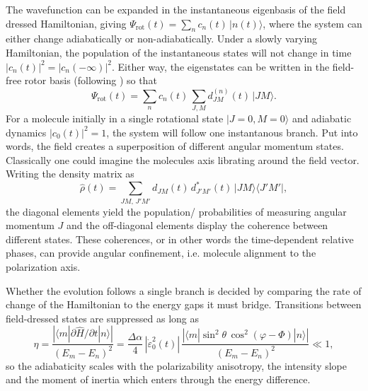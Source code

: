 The wavefunction can be expanded in the instantaneous eigenbasis of the field dressed Hamiltonian, giving $\Psi_{\mathrm{rot}}(t) = \sum_n c_n(t)\,|n(t)\rangle$, where the system can either change adiabatically or non-adiabatically. Under a slowly varying Hamiltonian, the population of the instantaneous states will not change in time $|c_n(t)|^2 = |c_n(-\infty)|^2$. Either way, the eigenstates can be written in the field-free rotor basis (following \cite{nielsenLaserInducedAlignmentMolecules2022}) so that 
\begin{equation}
    \Psi_{\mathrm{rot}}(t) = \sum_n c_n(t)\,\sum_{J,M} d^{(n)}_{JM}(t)\,\lvert J M\rangle .
    \label{eq:eigenstate_expansion}
\end{equation}
For a molecule initially in a single rotational state $\lvert J=0, M=0\rangle$ and adiabatic dynamics $|c_0(t)|^2 = 1$, the system will follow one instantanous branch.
Put into words, the field creates a superposition of different angular momentum states. Classically one could imagine the molecules axis librating around the field vector.
Writing the density matrix as
\begin{equation}
    \hat{\rho}(t) = \sum_{JM,\,J'M'} d_{JM}(t)\, d^{*}_{J'M'}(t)\, \lvert J M\rangle \langle J' M'\rvert ,
    \label{eq:density_matrix}
\end{equation}
the diagonal elements yield the population/ probabilities of measuring angular momentum $J$ and the off-diagonal elements display the coherence between different states. These coherences, or in other words the time-dependent relative phases, can provide angular confinement, i.e. molecule alignment to the polarization axis.

Whether the evolution follows a single branch is decided by comparing the rate of change of the Hamiltonian to the energy gaps it must bridge. Transitions between field-dressed states are suppressed as long as \cite{omisteTheoreticalDescriptionAdiabatic2011}
\begin{equation}
    \eta = \frac{\left|\langle m \left| \partial \hat H/\partial t \right| n\rangle\right|}{(E_m - E_n)^2} = \frac{\Delta\alpha}{4}\,\left|\dot\varepsilon_0^2(t)\right|\, \frac{ \left|\langle m|\sin^2\theta\,\cos^2(\varphi-\Phi)|n\rangle\right| }{ \left(E_m-E_n\right)^2 } \ll 1,
    \label{eq:adiabaticity_criterion}
\end{equation}
so the adiabaticity scales with the polarizability anisotropy, the intensity slope and the moment of inertia which enters through the energy difference.

